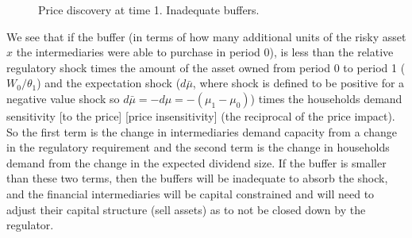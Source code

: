 \documentclass[11pt]{article}
\begin{document}
\begin{figure}[h]
\centering
{}
\caption{Price discovery at time 1. Inadequate buffers.}
\label{fig:t1unstableEqm}
\end{figure}

We see that if the buffer (in terms of how many additional units of the risky asset $x$ the intermediaries were able to purchase in period 0), is less than the relative regulatory shock times the amount of the asset owned from period 0 to period 1 ($W_0/\theta_1$) and the expectation shock ($d\bar{\mu}$, where shock is defined to be positive for a negative value shock so $d\bar{\mu} = -d\mu = -(\mu_1-\mu_0)$) times the households demand sensitivity [to the price] [price insensitivity] (the reciprocal of the price impact). So the first term is the change in intermediaries demand capacity from a change in the regulatory requirement and the second term is the change in households demand from the change in the expected dividend size. If the buffer is smaller than these two terms, then the buffers will be inadequate to absorb the shock, and the financial intermediaries will be capital constrained and will need to adjust their capital structure (sell assets) as to not be closed down by the regulator.
\end{document}
